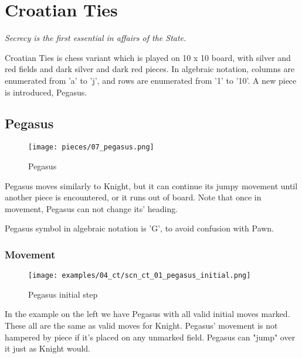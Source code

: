 
\chapter*{Croatian Ties}

\begin{flushright}
\parbox{0.7\textwidth}{
\emph{Secrecy is the first essential in affairs of the State. \\
 } }
\end{flushright}

\noindent
Croatian Ties is chess variant which is played on 10 x 10 board,
with silver and red fields and dark silver and dark red pieces.
In algebraic notation, columns are enumerated from 'a' to 'j',
and rows are enumerated from '1' to '10'. A new piece is
introduced, Pegasus.

\clearpage %

\section*{Pegasus}

\noindent
\begin{wrapfigure}[9]{l}{0.4\textwidth}
\centering
\texttt{[image: pieces/07\_pegasus.png]}
\caption{Pegasus}
\label{fig:07_pegasus}
\end{wrapfigure}
Pegasus moves similarly to Knight, but it can continue its jumpy movement
until another piece is encountered, or it runs out of board. Note that once
in movement, Pegasus can not change its' heading.

Pegasus symbol in algebraic notation is 'G', to avoid confusion with Pawn.

\vspace{2.0\baselineskip}
\subsection*{Movement}

\noindent
\begin{wrapfigure}[15]{l}{0.5\textwidth}
\centering
\texttt{[image: examples/04\_ct/scn\_ct\_01\_pegasus\_initial.png]}
\caption{Pegasus initial step}
\label{fig:scn_ct_01_pegasus_initial}
\end{wrapfigure}
In the example on the left we have Pegasus with all valid initial moves marked.
These all are the same as valid moves for Knight. Pegasus' movement is not hampered
by piece if it's placed on any unmarked field. Pegasus can "jump" over it just as
Knight would.

